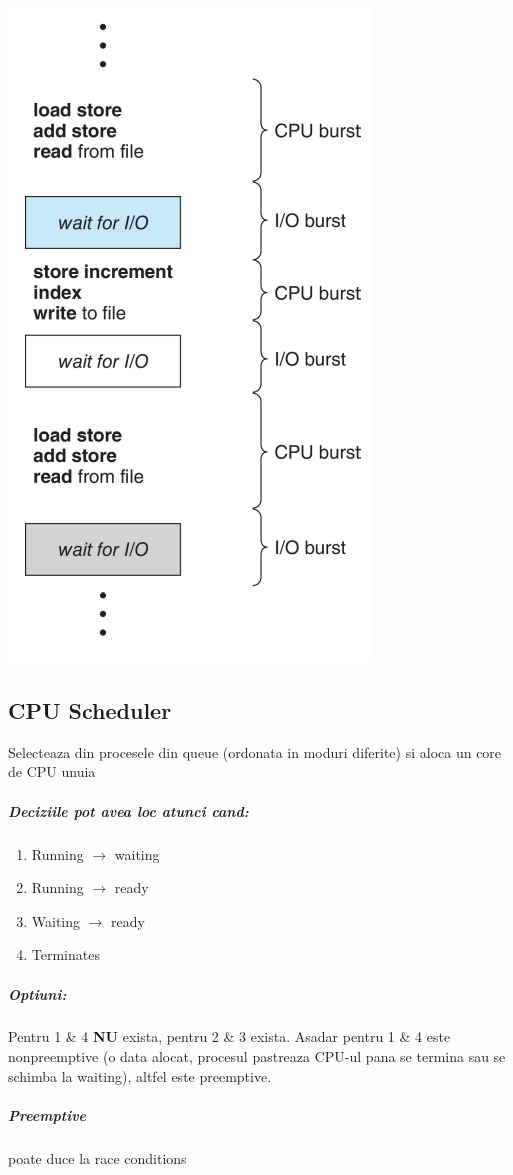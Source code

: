 \documentclass{article}
\begin{document}
\begin{center}
    \includegraphics[scale=0.3]{11_cpuioburstcycle.png}
\end{center}

\subsection*{CPU Scheduler} Selecteaza din procesele din queue (ordonata in moduri diferite) si aloca un core de CPU unuia
\subparagraph*{Deciziile pot avea loc atunci cand:}
\begin{enumerate}
    \item Running $\rightarrow$ waiting
    \item Running $\rightarrow$ ready
    \item Waiting $\rightarrow$ ready
    \item Terminates
\end{enumerate}
\subparagraph*{Optiuni:} Pentru 1 \& 4 \textbf{NU} exista, pentru 2 \& 3 exista. Asadar pentru 1 \& 4 este nonpreemptive (o data alocat, procesul pastreaza CPU-ul pana se termina sau se schimba la waiting), altfel este preemptive. 
\subparagraph*{Preemptive} poate duce la race conditions
\end{document}
